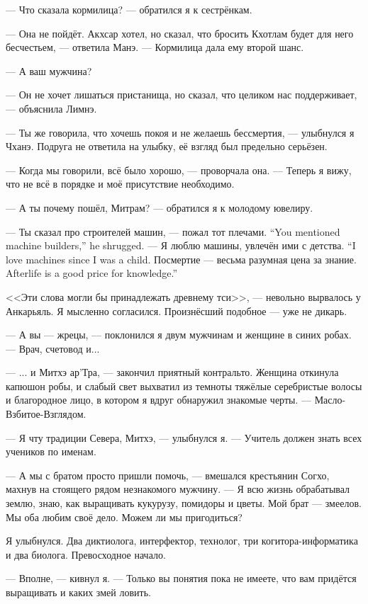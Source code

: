 --- Что сказала кормилица? --- обратился я к сестрёнкам.

--- Она не пойдёт.
Акхсар хотел, но сказал, что бросить Кхотлам будет для него бесчестьем, --- ответила Манэ.
--- Кормилица дала ему второй шанс.

--- А ваш мужчина?

--- Он не хочет лишаться пристанища, но сказал, что целиком нас поддерживает, --- объяснила Лимнэ.

--- Ты же говорила, что хочешь покоя и не желаешь бессмертия, --- улыбнулся я Чханэ.
Подруга не ответила на улыбку, её взгляд был предельно серьёзен.

--- Когда мы говорили, всё было хорошо, --- проворчала она.
--- Теперь я вижу, что не всё в порядке и моё присутствие необходимо.

--- А ты почему пошёл, Митрам? --- обратился я к молодому ювелиру.

{--- Ты сказал про строителей машин, --- пожал тот плечами.}
{``You mentioned machine builders,'' he shrugged.}
{--- Я люблю машины, увлечён ими с детства.}
{``I love machines since I was a child.}
{Посмертие --- весьма разумная цена за знание.}
{Afterlife is a good price for knowledge.''}

<<Эти слова могли бы принадлежать древнему тси>>, --- невольно вырвалось у Анкарьяль.
Я мысленно согласился.
Произнёсший подобное --- уже не дикарь.

--- А вы --- жрецы, --- поклонился я двум мужчинам и женщине в синих робах.
--- Врач, счетовод и...

---  ... и Митхэ ар'Тра, --- закончил приятный контральто.
Женщина откинула капюшон робы, и слабый свет выхватил из темноты тяжёлые серебристые волосы и благородное лицо, в котором я вдруг обнаружил знакомые черты.
--- Масло-Взбитое-Взглядом.

--- Я чту традиции Севера, Митхэ, --- улыбнулся я.
--- Учитель должен знать всех учеников по именам.

--- А мы с братом просто пришли помочь, --- вмешался крестьянин Согхо, махнув на стоящего рядом незнакомого мужчину.
--- Я всю жизнь обрабатывал землю, знаю, как выращивать кукурузу, помидоры и цветы.
Мой брат --- змеелов.
Мы оба любим своё дело.
Можем ли мы пригодиться?

Я улыбнулся.
Два диктиолога, интерфектор, технолог, три когитора-информатика и два биолога.
Превосходное начало.

--- Вполне, --- кивнул я.
--- Только вы понятия пока не имеете, что вам придётся выращивать и каких змей ловить.

